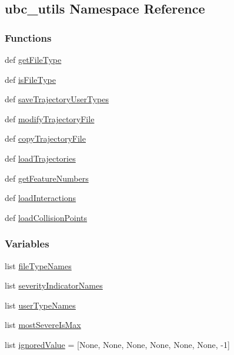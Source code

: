 \hypertarget{namespaceubc__utils}{\subsection{ubc\-\_\-utils Namespace Reference}
\label{namespaceubc__utils}
}
\subsubsection*{Functions}
\begin{DoxyCompactItemize}
\item 
def \hyperlink{namespaceubc__utils_ae51f712f0233e73b762aa70649669414}{get\-File\-Type}
\item 
def \hyperlink{namespaceubc__utils_ae79ff1e5e7f4fb3732cb4d1b089287c1}{is\-File\-Type}
\item 
def \hyperlink{namespaceubc__utils_a0a20fa5b1bb98635a0d55c41ebae21ad}{save\-Trajectory\-User\-Types}
\item 
def \hyperlink{namespaceubc__utils_a51833f9577c4eb6b8e99e0b99cef4693}{modify\-Trajectory\-File}
\item 
def \hyperlink{namespaceubc__utils_aebfc22fcb83e42682d8091172b3740c8}{copy\-Trajectory\-File}
\item 
def \hyperlink{namespaceubc__utils_a24596344ca92b512a6ba25e79fca2214}{load\-Trajectories}
\item 
def \hyperlink{namespaceubc__utils_a2440b5c3b2ec574342cbfd6b1f2f4c96}{get\-Feature\-Numbers}
\item 
def \hyperlink{namespaceubc__utils_a69dfa884607272842ecd9399819ec7bc}{load\-Interactions}
\item 
def \hyperlink{namespaceubc__utils_ab1c88de84a5bff4f621ac9c6d4e70836}{load\-Collision\-Points}
\end{DoxyCompactItemize}
\subsubsection*{Variables}
\begin{DoxyCompactItemize}
\item 
list \hyperlink{namespaceubc__utils_a0316c895833fa377630ae2a6dc71abdb}{file\-Type\-Names}
\item 
list \hyperlink{namespaceubc__utils_a549bb3c360005ade48b6727c1a951428}{severity\-Indicator\-Names}
\item 
list \hyperlink{namespaceubc__utils_a7c84647a9ae38b213b3653cd33d4a2bb}{user\-Type\-Names}
\item 
list \hyperlink{namespaceubc__utils_a1cc8fc4e15a9d724f5a14bb4584b8623}{most\-Severe\-Is\-Max}
\item 
list \hyperlink{namespaceubc__utils_aa1bfdf04f7df283cda5d90b9f6d2d8aa}{ignored\-Value} = \mbox{[}None, None, None, None, None, None, -\/1\mbox{]}
\end{DoxyCompactItemize}


